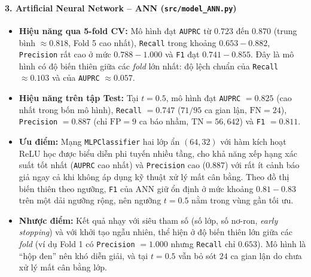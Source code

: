 \paragraph{3. Artificial Neural Network -- ANN (\texttt{src/model\_ANN.py})}\mbox{}
\begin{itemize}
    \item \textbf{Hiệu năng qua 5-fold CV:} Mô hình đạt \texttt{AUPRC} từ $0.723$ đến $0.870$ (trung bình $\approx 0.818$, Fold 5 cao nhất), \texttt{Recall} trong khoảng $0.653 - 0.882$, \texttt{Precision} rất cao ở mức $0.788 - 1.000$ và \texttt{F1} đạt $0.741 - 0.855$. Đây là mô hình có độ biến thiên giữa các \textit{fold} lớn nhất: độ lệch chuẩn của \texttt{Recall} $\approx 0.103$ và của \texttt{AUPRC} $\approx 0.057$.
    \item \textbf{Hiệu năng trên tập Test:} Tại $t = 0.5$, mô hình đạt \texttt{AUPRC} $= 0.825$ (cao nhất trong bốn mô hình), \texttt{Recall} $= 0.747$ ($71/95$ ca gian lận, $\text{FN} = 24$), \texttt{Precision} $= 0.887$ (chỉ $\text{FP} = 9$ ca báo nhầm, $\text{TN} = 56{,}642$) và \texttt{F1} $= 0.811$.
    \item \textbf{Ưu điểm:} Mạng \texttt{MLPClassifier} hai lớp ẩn $(64, 32)$ với hàm kích hoạt ReLU học được biểu diễn phi tuyến nhiều tầng, cho khả năng xếp hạng xác suất tốt nhất (\texttt{AUPRC} cao nhất) và \texttt{Precision} cao ($0.887$) với rất ít cảnh báo giả ngay cả khi không áp dụng kỹ thuật xử lý mất cân bằng. Theo đồ thị biến thiên theo ngưỡng, \texttt{F1} của ANN giữ ổn định ở mức khoảng $0.81 - 0.83$ trên một dải ngưỡng rộng, nên ngưỡng $t = 0.5$ nằm trong vùng gần tối ưu.
    \item \textbf{Nhược điểm:} Kết quả nhạy với siêu tham số (số lớp, số nơ-ron, \textit{early stopping}) và với khởi tạo ngẫu nhiên, thể hiện ở độ biến thiên lớn giữa các \textit{fold} (ví dụ Fold 1 có \texttt{Precision} $= 1.000$ nhưng \texttt{Recall} chỉ $0.653$). Mô hình là ``hộp đen'' nên khó diễn giải, và tại $t = 0.5$ vẫn bỏ sót $24$ ca gian lận do chưa xử lý mất cân bằng lớp.
\end{itemize}

